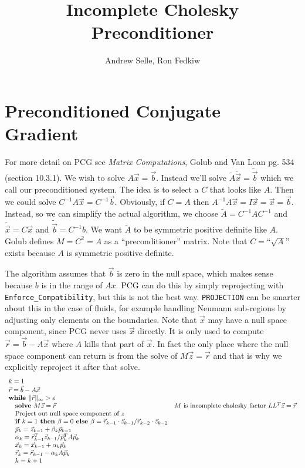 \documentclass{article}
\title{Incomplete Cholesky Preconditioner}
\author{Andrew Selle, Ron Fedkiw}
\newcommand{\vecx}{\vec{x}}
\newcommand{\vecb}{\vec{b}}
\newcommand{\vecr}{\vec{r}}
\newcommand{\vecz}{\vec{z}}
\newcommand{\vecp}{\vec{p}}
\newcommand{\pkeyword}[1]{\textbf{#1 }}
\newcommand{\pwhile}{\pkeyword{while}}
\newcommand{\pif}{\pkeyword{if}}
\newcommand{\pthen}{\pkeyword{ then}}
\newcommand{\pelse}{\pkeyword{ else}}
\newcommand{\pindent}{\textrm{\quad}}
\newcommand{\pcomment}[1]{\textrm{#1}}
\begin{document}
\maketitle
\section{Preconditioned Conjugate Gradient}

For more detail on PCG see \emph{Matrix Computations}, Golub and Van Loan pg. 534 (section 10.3.1).  We wish to solve $A\vecx=\vecb$. Instead we'll
solve $\tilde{A}\tilde{\vecx}=\tilde{\vecb}$ which we call our preconditioned system.  The idea is to select a $C$ that looks like $A$.  Then we
could solve $C^{-1}A\vecx=C^{-1}\vecb$. Obviously, if $C=A$ then $A^{-1}A\vecx=I\vecx=\vecx=\vecb$. Instead, so we can simplify the actual algorithm,
we choose $\tilde{A}=C^{-1}AC^{-1}$ and $\tilde{\vecx} =C\vecx$ and $\tilde{\vecb}=C^{-1}b$. We want $\tilde{A}$ to be symmetric positive definite
like $A$. Golub defines $M=C^2=A$ as a ``preconditioner'' matrix. Note that $C=$``$\sqrt{A}$'' exists because $A$ is symmetric positive definite.

The algorithm assumes that $\vecb$ is zero in the null space, which makes sense because $b$ is in the range of $Ax$. PCG can do this by simply
reprojecting  with \verb|Enforce_Compatibility|, but this is not the best way. \verb|PROJECTION| can be smarter about this in the case of fluids, for
example handling Neumann sub-regions by adjusting only elements on the boundaries. Note that $\vecx$ may have a null space component, since PCG never
uses $\vecx$ directly. It is only used to compute $\vecr=\vecb-A\vecx$ where $A$ kills that part of $\vecx$. In fact the only place where the null
space component can return is from the solve of $M\vecz=\vecr$ and that is why we explicitly reproject it after that solve.
$$\begin{array}{ll}
k=1\\
\vecr=\vecb -A\vecx  & \\
\pwhile \|\vecr\|_\infty > \varepsilon & \\
\pindent \pkeyword{solve} M\vecz=\vecr & \pcomment{$M$ is incomplete
cholesky factor $LL^T\vecz=\vecr$}\\
\pindent\pcomment{Project out null space component of $z$}&
\\
\pindent\pif k=1 \pthen \beta=0 \pelse \beta=\vecr_{k-1}\cdot\vecz_{k-1}/\vecr_{k-2}\cdot\vecz_{k-2}&\\
\pindent \vecp_k=\vecz_{k-1}+\beta_k\vecp_{k-1}&\\
\pindent \alpha_k=\vecr_{k-1}^T\vecz_{k-1}/\vecp_k^TA\vecp_k&\\
\pindent \vecx_k=\vecx_{k-1}+\alpha_k \vecp_k\\
\pindent \vecr_k=\vecr_{k-1}-\alpha_kA\vecp_k\\
\pindent k=k+1\\
\end{array}$$
\end{document}
